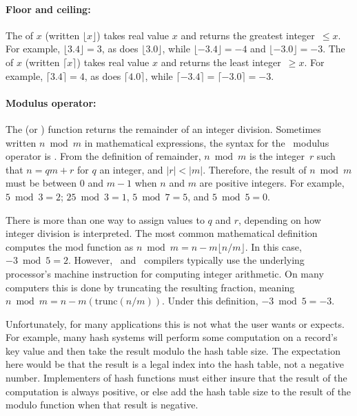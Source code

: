\paragraph{Floor and ceiling:}
The  of \(x\) (written
\(\lfloor x \rfloor\)) takes real value \(x\) and returns the greatest 
integer~\(\leq x\).
For example, \(\lfloor 3.4 \rfloor = 3\), as does \(\lfloor 3.0 \rfloor\), 
while \(\lfloor -3.4 \rfloor = -4\) and \(\lfloor -3.0 \rfloor = -3\).
The  of \(x\) (written
\(\lceil x \rceil\)) takes real value \(x\) and returns the least
integer~\(\geq x\).
For example, \(\lceil 3.4 \rceil = 4\), as does \(\lceil 4.0 \rceil\),
while \(\lceil -3.4 \rceil = \lceil -3.0 \rceil = -3\).

\paragraph{Modulus operator:}
The  (or )
function returns the remainder of an integer division.
Sometimes written \(n \bmod m\) in mathematical expressions,
the syntax for the \Lang\ modulus operator is .
From the definition of remainder, \(n \bmod m\) is the integer~\(r\)
such that \(n = qm + r\) for \(q\) an integer, and \(|r| < |m|\).
Therefore, the result of \(n \bmod m\) must be between 0 and \(m-1\)
when \(n\) and \(m\) are positive integers.
For example, \(5 \bmod 3 = 2\); \(25 \bmod 3 = 1\), \(5 \bmod 7 = 5\),
and \(5 \bmod 5 = 0\).

There is more than one way to assign values to \(q\)
and \(r\), depending on how integer division is interpreted.
The most common mathematical definition computes the mod function as
\(n \bmod m = n - m\lfloor n/m\rfloor\).
In this case, \(-3 \bmod 5 = 2\).
However, \LangJava\ and \LangCPP\ compilers typically use the underlying
processor's machine instruction for computing integer arithmetic.
On many computers this is done by truncating the resulting fraction,
meaning \(n \bmod m = n - m (\mathrm{trunc}(n/m))\).
Under this definition, \(-3 \bmod 5 = -3\).

Unfortunately, for many applications this is not what the user wants
or expects.
For example, many hash systems will perform some
computation on a record's key value and then take the result modulo the
hash table size.
The expectation here would be that the result is a legal index into
the hash table, not a negative number.
Implementers of hash functions must either insure that the
result of the computation is always positive, or else add the hash
table size to the result of the modulo function when that result is
negative.

